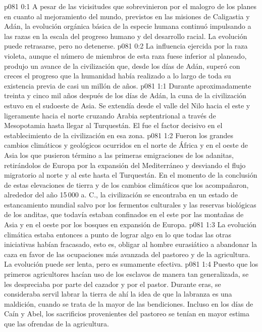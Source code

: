 \author{Arcángel}
\vs p081 0:1 A pesar de las vicisitudes que sobrevinieron por el malogro de los planes en cuanto al mejoramiento del mundo, previstos en las misiones de Caligastia y Adán, la evolución orgánica básica de la especie humana continuó impulsando a las razas en la escala del progreso humano y del desarrollo racial. La evolución puede retrasarse, pero no detenerse.
\vs p081 0:2 La influencia ejercida por la raza violeta, aunque el número de miembros de esta raza fuese inferior al planeado, produjo un avance de la civilización que, desde los días de Adán, superó con creces el progreso que la humanidad había realizado a lo largo de toda su existencia previa de casi un millón de años.
\vs p081 1:1 Durante aproximadamente treinta y cinco mil años después de los días de Adán, la cuna de la civilización estuvo en el sudoeste de Asia. Se extendía desde el valle del Nilo hacia el este y ligeramente hacia el norte cruzando Arabia septentrional a través de Mesopotamia hasta llegar al Turquestán. El  fue el factor decisivo en el establecimiento de la civilización en esa zona.
\vs p081 1:2 Fueron los grandes cambios climáticos y geológicos ocurridos en el norte de África y en el oeste de Asia los que pusieron término a las primeras emigraciones de los adanitas, retirándolos de Europa por la expansión del Mediterráneo y desviando el flujo migratorio al norte y al este hasta el Turquestán. En el momento de la conclusión de estas elevaciones de tierra y de los cambios climáticos que los acompañaron, alrededor del año 15\,000 a. C., la civilización se encontraba en un estado de estancamiento mundial salvo por los fermentos culturales y las reservas biológicas de los anditas, que todavía estaban confinados en el este por las montañas de Asia y en el oeste por los bosques en expansión de Europa.
\vs p081 1:3 La evolución climática estaba entonces a punto de lograr algo en lo que todas las otras iniciativas habían fracasado, esto es, obligar al hombre eurasiático a abandonar la caza en favor de las ocupaciones más avanzada del pastoreo y de la agricultura. La evolución puede ser lenta, pero es sumamente efectiva.
\vs p081 1:4 Puesto que los primeros agricultores hacían uso de los esclavos de manera tan generalizada, se les despreciaba por parte del cazador y por el pastor. Durante eras, se consideraba servil labrar la tierra de ahí la idea de que la labranza es una maldición, cuando se trata de la mayor de las bendiciones. Incluso en los días de Caín y Abel, los sacrificios provenientes del pastoreo se tenían en mayor estima que las ofrendas de la agricultura.
